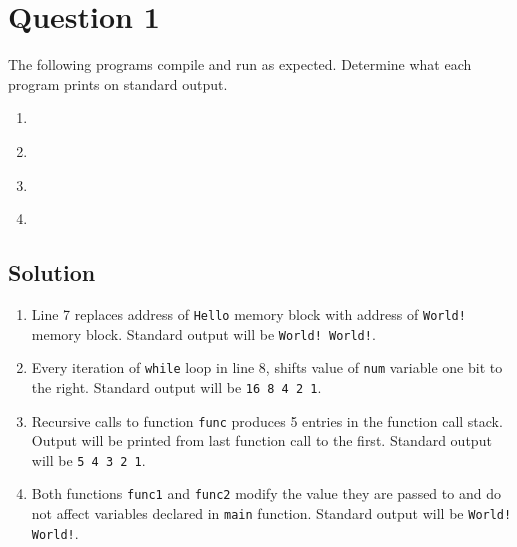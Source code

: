 \documentclass[12pt,letterpaper,twoside]{article}
\begin{document}


\section*{Question 1}

The following programs compile and run as expected.
Determine what each program prints on standard output.

\lstset{language=c,tabsize=4}
\begin{enumerate}[label=(\alph*)]
\item \lstinline{}

\item \lstinline{}

\item \lstinline{}

\item \lstinline{}

\end{enumerate}

\subsection*{Solution}

\begin{enumerate}[label=(\alph*)]
\item
Line 7 replaces address of \texttt{Hello} memory block with address of \texttt{World!} memory block.
Standard output will be \texttt{World! World!}.

\item
Every iteration of \texttt{while} loop in line 8, shifts value of \texttt{num} variable one bit to the right.
Standard output will be \texttt{16 8 4 2 1}.

\item
Recursive calls to function \texttt{func} produces 5 entries in the function call stack.
Output will be printed from last function call to the first.
Standard output will be \texttt{5 4 3 2 1}.

\item
Both functions \texttt{func1} and \texttt{func2} modify the value they are passed to and do not affect variables declared in \texttt{main} function.
Standard output will be \texttt{World! World!}.
\end{enumerate}
\end{document}
